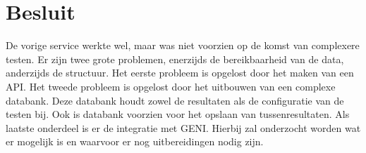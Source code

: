 \section{Besluit}
De vorige service werkte wel, maar was niet voorzien op de komst van complexere testen. Er zijn twee grote problemen, enerzijds de bereikbaarheid van de data, anderzijds de structuur. Het eerste probleem is opgelost door het maken van een API. Het tweede probleem is opgelost door het uitbouwen van een complexe databank. Deze databank houdt zowel de resultaten als de configuratie van de testen bij. Ook is databank voorzien voor het opslaan van tussenresultaten. Als laatste onderdeel is er de integratie met GENI. Hierbij zal onderzocht worden wat er mogelijk is en waarvoor er nog uitbereidingen nodig zijn.